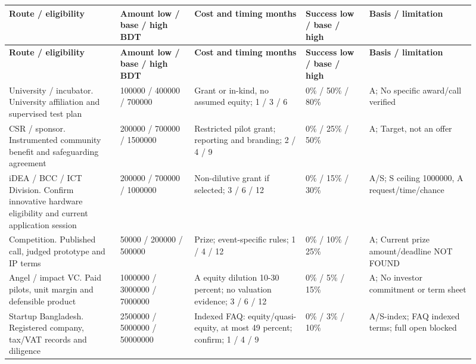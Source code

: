 \documentclass[11pt,a4paper]{article}
\begin{document}
{\scriptsize
\setlength{\tabcolsep}{3pt}\renewcommand{\arraystretch}{1.18}
\begin{longtable}{@{}>{\raggedright\arraybackslash}p{0.2197\linewidth}>{\raggedright\arraybackslash}p{0.1443\linewidth}>{\raggedright\arraybackslash}p{0.2197\linewidth}>{\raggedright\arraybackslash}p{0.1255\linewidth}>{\raggedright\arraybackslash}p{0.2008\linewidth}@{}}
\toprule \textbf{Route / eligibility} & \textbf{Amount low / base / high BDT} & \textbf{Cost and timing months} & \textbf{Success low / base / high} & \textbf{Basis / limitation} \\ \midrule
\endfirsthead\toprule \textbf{Route / eligibility} & \textbf{Amount low / base / high BDT} & \textbf{Cost and timing months} & \textbf{Success low / base / high} & \textbf{Basis / limitation} \\ \midrule
\endhead\bottomrule\endfoot
University / incubator. University affiliation and supervised test plan & \num{100000} / \num{400000} / \num{700000} & Grant or in-kind, no assumed equity; \num{1} / \num{3} / \num{6} & \num{0}\% / \num{50}\% / \num{80}\% & A; No specific award/call verified \cite{site} \\
CSR / sponsor. Instrumented community benefit and safeguarding agreement & \num{200000} / \num{700000} / \num{1500000} & Restricted pilot grant; reporting and branding; \num{2} / \num{4} / \num{9} & \num{0}\% / \num{25}\% / \num{50}\% & A; Target, not an offer \cite{wb} \\
iDEA / BCC / ICT Division. Confirm innovative hardware eligibility and current application session & \num{200000} / \num{700000} / \num{1000000} & Non-dilutive grant if selected; \num{3} / \num{6} / \num{12} & \num{0}\% / \num{15}\% / \num{30}\% & A/S; S ceiling 1000000, A request/time/chance \cite{idea} \\
Competition. Published call, judged prototype and IP terms & \num{50000} / \num{200000} / \num{500000} & Prize; event-specific rules; \num{1} / \num{4} / \num{12} & \num{0}\% / \num{10}\% / \num{25}\% & A; Current prize amount/deadline NOT FOUND \cite{idea} \\
Angel / impact VC. Paid pilots, unit margin and defensible product & \num{1000000} / \num{3000000} / \num{7000000} & A equity dilution 10-30 percent; no valuation evidence; \num{3} / \num{6} / \num{12} & \num{0}\% / \num{5}\% / \num{15}\% & A; No investor commitment or term sheet \cite{startup} \\
Startup Bangladesh. Registered company, tax/VAT records and diligence & \num{2500000} / \num{5000000} / \num{50000000} & Indexed FAQ: equity/quasi-equity, at most 49 percent; confirm; \num{1} / \num{4} / \num{9} & \num{0}\% / \num{3}\% / \num{10}\% & A/S-index; FAQ indexed terms; full open blocked \cite{startup} \\

\end{longtable}}
\end{document}
